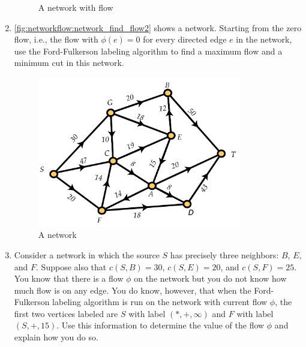 \begin{enumerate}
\begin{figure}
    \caption{A network with flow}
    \label{fig:networkflow:network_find_flow1}
  \end{figure}
\item \autoref{fig:networkflow:network_find_flow2} shows a
  network. Starting from the zero flow, i.e., the flow with
  $\phi(e)=0$ for every directed edge $e$ in the network, use the
  Ford-Fulkerson labeling algorithm to find a maximum flow and a
  minimum cut in this network.
  \begin{figure}
    \centering
    \includegraphics[width=3.5in]{networkflow-figs/network_find_flow2}
    \caption{A network}
    \label{fig:networkflow:network_find_flow2}
  \end{figure}
\item Consider a network in which the source $S$ has precisely three
  neighbors: $B$, $E$, and $F$. Suppose also that $c(S,B)=30$,
  $c(S,E)=20$, and $c(S,F)=25$. You know that there is a flow $\phi$
  on the network but you do not know how much flow is on any edge. You
  do know, however, that when the Ford-Fulkerson labeling algorithm is
  run on the network with current flow $\phi$, the first two vertices
  labeled are $S$ with label $(*,+,\infty)$ and $F$ with label
  $(S,+,15)$. Use this information to determine the value of the flow
  $\phi$ and explain how you do so.

\end{enumerate}


